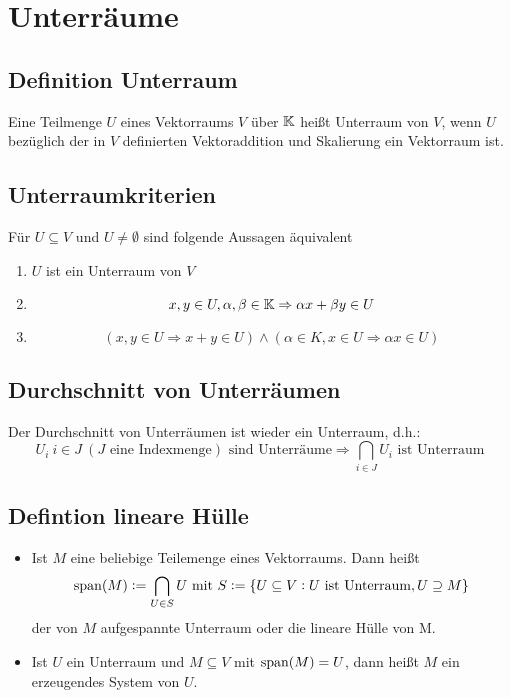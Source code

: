 \section{Unterräume}
\subsection{Definition Unterraum}
Eine Teilmenge $U$ eines Vektorraums $V$ über $\mathbb{K}$ heißt Unterraum von $V$, wenn
$U$ bezüglich der in $V$ definierten Vektoraddition und Skalierung ein Vektorraum
ist.

\subsection{Unterraumkriterien}
Für $U \subseteq V$ und $U \neq \emptyset$ sind folgende Aussagen äquivalent
\begin{enumerate}[label = (\alph*)]
    \item $U$ ist ein Unterraum von $V$
    \item
        \begin{equation*}
            x,y \in U, \alpha, \beta \in \mathbb{K} \Rightarrow
            \alpha x + \beta y \in U
        \end{equation*}
    \item
        \begin{equation*}
            (x,y \in U \Rightarrow x+y \in U) \land
            (\alpha \in K, x \in U \Rightarrow \alpha x \in U)
        \end{equation*}
\end{enumerate}

\subsection{Durchschnitt von Unterräumen}
Der Durchschnitt von Unterräumen ist wieder ein Unterraum, d.h.:
\begin{equation*}
    U_i\ i \in J\ (J\text{ eine Indexmenge}) \text{ sind Unterräume}
    \Rightarrow \bigcap_{i \in J} U_i \text{ ist Unterraum}
\end{equation*}

\subsection{Defintion lineare Hülle}
\begin{itemize}
    \item Ist $M$ eine beliebige Teilemenge eines Vektorraums. Dann heißt
        \begin{equation*}
            \operatorname{span} (M) := \bigcap_{U \in S} U \text{ mit }
            S := \{ U \subseteq V: U \text{ ist Unterraum}, U \supseteq M \}
        \end{equation*}
        der von $M$ aufgespannte Unterraum oder die lineare Hülle von M.
    \item Ist $U$ ein Unterraum und $M \subseteq V$ mit $\operatorname{span}(M) = U$, dann heißt
        $M$ ein erzeugendes System von $U$.
\end{itemize}

